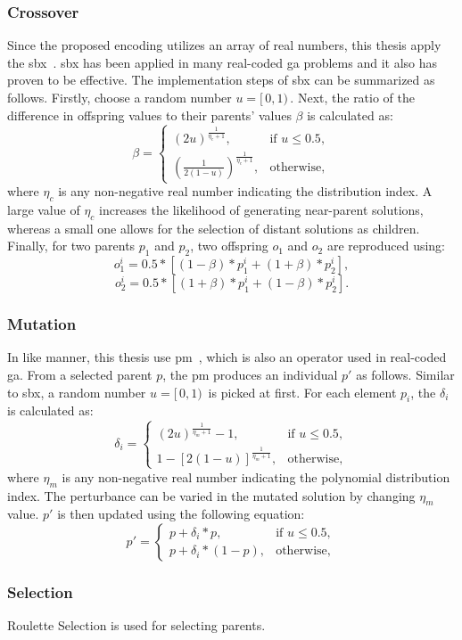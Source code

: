 \subsubsection{Crossover}
Since the proposed encoding utilizes an array of real numbers, this thesis apply the \gls{sbx}~\cite{deb1995simulated}. \gls{sbx} has been applied in many real-coded \gls{ga} problems and it also has proven to be effective. The implementation steps of \gls{sbx} can be summarized as follows. Firstly, choose a random number $u = [ \, 0, 1) \,$. Next, the ratio of the difference in offspring values to their parents' values $\beta$ is calculated as:
\begin{equation}
	\beta = 
	\begin{cases}
		(2u)^{\frac{1}{\eta_c + 1}}, & \text{if $u \leq 0.5$},\\
		(\frac{1}{2(1 - u)})^{\frac{1}{\eta_c + 1}}, & \text{otherwise},
	\end{cases}  
\end{equation}
where $\eta_c$ is any non-negative real number indicating the distribution index. A large value of $\eta_c$ increases the likelihood of generating near-parent solutions, whereas a small one allows for the selection of distant solutions as children. Finally, for two parents $p_1$ and $p_2$, two offspring $o_1$ and $o_2$ are reproduced using:
\begin{equation}
	o^i_1 = 0.5*[(1-\beta)*p^i_1 + (1+\beta)*p^i_2],
\end{equation}
\begin{equation}
	o^i_2 = 0.5*[(1+\beta)*p^i_1 + (1-\beta)*p^i_2].
\end{equation}

\subsubsection{Mutation}
In like manner, this thesis use \gls{pm}~\cite{deb2014analysing}, which is also an operator used in real-coded \gls{ga}. From a selected parent $p$, the \gls{pm} produces an individual $p'$ as follows. Similar to \gls{sbx}, a random number $u = 	[ \, 0, 1) \,$ is picked at first. For each element $p_i$, the $\delta_i$ is calculated as:
\begin{equation}
	\delta_i = 
	\begin{cases}
		(2u)^{\frac{1}{\eta_m + 1}} - 1, & \text{if $u \leq 0.5$},\\
		1 - [2(1-u)]^{\frac{1}{\eta_m + 1}}, & \text{otherwise},
	\end{cases}
\end{equation}
where $\eta_m$ is any non-negative real number indicating the polynomial distribution index. The perturbance can be varied in the mutated solution by changing $\eta_m$ value. $p'$ is then updated using the following equation:
\begin{equation}
	p' = 
	\begin{cases}
		p + \delta_i * p, & \text{if $u \leq 0.5$},\\
		p + \delta_i * (1-p), & \text{otherwise},
	\end{cases}
\end{equation}

\subsubsection{Selection}
Roulette Selection is used for selecting parents.